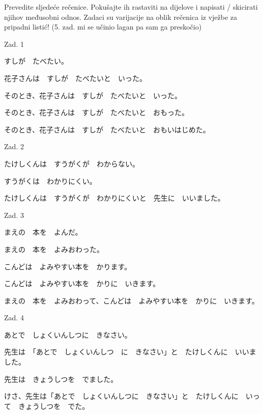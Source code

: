 
\author{Tomislav Mamić}

	
	\noindent Prevedite sljedeće rečenice. Pokušajte ih rastaviti na dijelove i napisati / skicirati njihov međusobni odnos. Zadaci su varijacije na oblik rečenica iz vježbe za pripadni listić! (5. zad. mi se učinio lagan pa sam ga preskočio)
	
	\begin{mondai}{Zad. 1}
		\item すしが　たべたい。
		\item 花子さんは　すしが　たべたいと　いった。
		\item そのとき、花子さんは　すしが　たべたいと　いった。
		\item そのとき、花子さんは　すしが　たべたいと　おもった。
		\item そのとき、花子さんは　すしが　たべたいと　おもいはじめた。
	\end{mondai}

	\begin{mondai}{Zad. 2}
		\item たけしくんは　すうがくが　わからない。
		\item すうがくは　わかりにくい。
		\item たけしくんは　すうがくが　わかりにくいと　先生に　いいました。
	\end{mondai}

	\begin{mondai}{Zad. 3}
		\item まえの　本を　よんだ。
		\item まえの　本を　よみおわった。
		\item こんどは　よみやすい本を　かります。
		\item こんどは　よみやすい本を　かりに　いきます。
		\item まえの　本を　よみおわって、こんどは　よみやすい本を　かりに　いきます。
	\end{mondai}

	\begin{mondai}{Zad. 4}
		\item あとで　しょくいんしつに　きなさい。
		\item 先生は　「あとで　しょくいんしつ　に　きなさい」と　たけしくんに　いいました。
		\item 先生は　きょうしつを　でました。
		\item けさ、先生は「あとで　しょくいんしつに　きなさい」と　たけしくんに　いって　きょうしつを　でた。
	\end{mondai}

